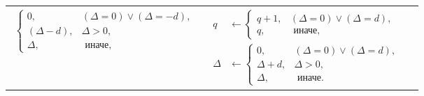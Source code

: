 \begin{frame}
{\begin{tabular}{c||c|c|}
{\begin{align*}
                        \begin{cases}
                            0,          & (\Delta = 0) \lor (\Delta = -d), \\
                            (\Delta-d), & \Delta > 0, \\
                            \Delta,     & \text{ иначе,}
                        \end{cases}
                    \end{align*}
                }
                    & 
                    \parbox[c]{.3\textwidth}{
                        \begin{align*}
                            q&\gets 
                            \begin{cases}
                                q+1, & (\Delta = 0) \lor (\Delta = d), \\
                                q,   &\text{ иначе,}
                            \end{cases}
                            \\
                            \Delta&\gets 
                            \begin{cases}
                                0,        & (\Delta = 0) \lor (\Delta = d), \\
                                \Delta+d, & \Delta > 0, \\
                                \Delta,   & \text{ иначе.}
                            \end{cases}
                        \end{align*}
                    } \\ \hline
        \end{tabular}
    }
\end{frame}

